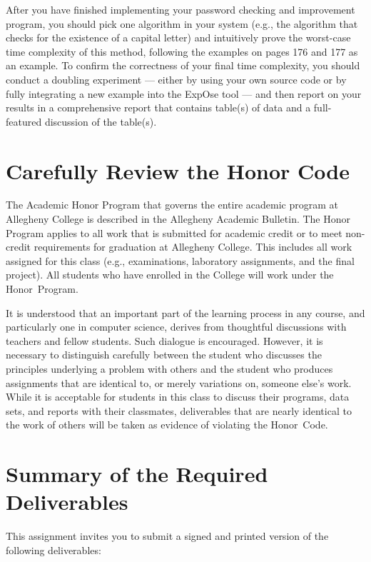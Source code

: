After you have finished implementing your password checking and improvement program, you should pick one algorithm in
your system (e.g., the algorithm that checks for the existence of a capital letter) and intuitively prove the worst-case
time complexity of this method, following the examples on pages 176 and 177 as an example. To confirm the correctness of
your final time complexity, you should conduct a doubling experiment --- either by using your own source code or by
fully integrating a new example into the {\sc ExpOse} tool --- and then report on your results in a comprehensive report
that contains table(s) of data and a full-featured discussion of the table(s).

\section*{Carefully Review the Honor Code}

The Academic Honor Program that governs the entire academic program at Allegheny College is described in the Allegheny
Academic Bulletin. The Honor Program applies to all work that is submitted for academic credit or to meet non-credit
requirements for graduation at Allegheny College. This includes all work assigned for this class (e.g., examinations,
laboratory assignments, and the final project). All students who have enrolled in the College will work under the
\mbox{Honor Program}.

\noindent It is understood that an important part of the learning process in any course, and particularly one in
computer science, derives from thoughtful discussions with teachers and fellow students. Such dialogue is encouraged.
However, it is necessary to distinguish carefully between the student who discusses the principles underlying a problem
with others and the student who produces assignments that are identical to, or merely variations on, someone else's
work. While it is acceptable for students in this class to discuss their programs, data sets, and reports with their
classmates, deliverables that are nearly identical to the work of others will be taken as evidence of violating the
\mbox{Honor Code}.

\section*{Summary of the Required Deliverables}

This assignment invites you to submit a signed and printed version of the following deliverables:


